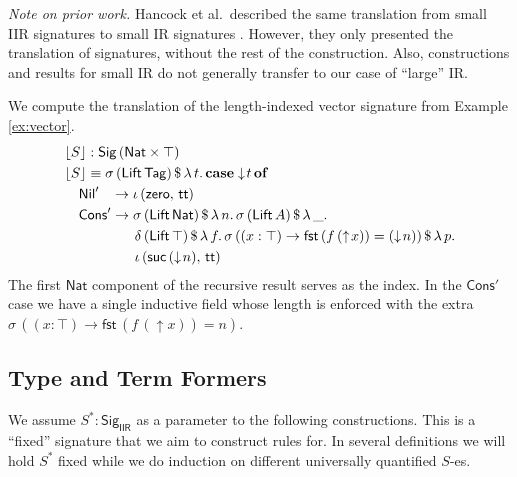 \documentclass[acmsmall,screen,review,anonymous]{acmart}
\newcommand{\msf}[1]{{\mathsf{#1}}}
\newcommand{\mbf}[1]{{\mathbf{#1}}}
\newcommand{\Nat}{\msf{Nat}}
\newcommand{\zero}{\msf{zero}}
\newcommand{\suc}{\msf{suc}}
\newcommand{\Nil}{\msf{Nil}}
\newcommand{\Cons}{\msf{Cons}}
\newcommand{\Lift}{\msf{Lift}}
\newcommand{\lup}{\uparrow}
\newcommand{\ldown}{\downarrow}
\newcommand{\Sig}{\msf{Sig}}
\newcommand{\Tag}{\msf{Tag}}
\newcommand{\case}{\mbf{case}}
\newcommand{\of}{\mbf{of}}
\newcommand{\ttt}{\msf{tt}}
\newcommand{\fst}{\msf{fst}}
\newcommand{\IIR}{\msf{IIR}}
\newcommand{\floord}[1]{\lfloor #1 \rfloor}
\begin{document}
\emph{Note on prior work.} Hancock et al.\ described the same translation from small IIR signatures
to small IR signatures \cite[Section~6]{DBLP:conf/tlca/HancockMGMA13}. However, they only presented
the translation of signatures, without the rest of the construction. Also, constructions and results
for small IR do not generally transfer to our case of ``large'' IR.

\begin{example} We compute the translation of the length-indexed vector signature from Example \ref{ex:vector}.
\begin{alignat*}{4}
  & \floord{S} : \Sig\,(\Nat \times \top)\\
  & \floord{S} \equiv \sigma\,(\Lift\,\Tag)\,\$\,\lambda\,t.\,\case \ldown\!t\,\of \\
  & \quad \Nil'\hspace{0.85em} \to \iota\,(\zero,\,\ttt) \\
  & \quad \Cons'\to \sigma\,(\Lift\,\Nat)\,\$\,\lambda\,n.\,\sigma\,(\Lift\,A)\,\$\,\lambda\,\_.\\
  & \quad \hspace{4em}  \delta\,(\Lift\,\top)\,\$\,\lambda\,f.\,\sigma\,((x : \top) \to \fst\,(f\,(\lup\!x)) = (\ldown\!n))\,\$\,\lambda\,p.\\
  & \quad \hspace{4em}  \iota\,(\suc\,(\ldown\!n),\,\ttt)
\end{alignat*}
The first $\Nat$ component of the recursive result serves as the index. In the $\Cons'$ case we
have a single inductive field whose length is enforced with the extra $\sigma\,((x : \top) \to
\fst\,(f\,(\lup\!x)) = n)$.

\end{example}

\subsection{Type and Term Formers}\label{sec:iir-construction-type-term}
We assume $S^* : \Sig_\IIR$ as a parameter to the following constructions. This is a ``fixed''
signature that we aim to construct rules for. In several definitions we will hold $S^*$ fixed while
we do induction on different universally quantified $S$-es.
\end{document}
